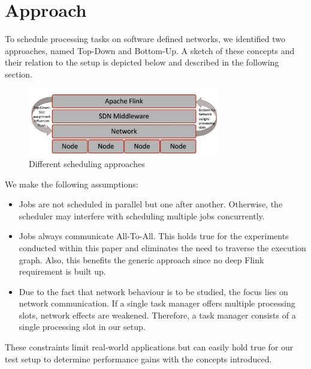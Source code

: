 \section{Approach}
To schedule processing tasks on software defined networks, we identified two approaches, named
Top-Down and Bottom-Up. A sketch of these concepts and their relation to the setup is depicted below
and described in the following section.\\

\begin{figure}[h]
    \centering
    \includegraphics[width=0.75\textwidth]{graphics/schedulingapproaches.png}
    \caption{Different scheduling approaches}
    \label{fig:schedulingapproaches}
\end{figure}

We make the following assumptions:
\begin{itemize}
\item Jobs are not scheduled in parallel but one after another. Otherwise, the scheduler may interfere
with scheduling multiple jobs concurrently.

\item Jobs always communicate All-To-All. This holds true for the experiments conducted within this paper
and eliminates the need to traverse the execution graph. Also, this benefits the generic approach
since no deep Flink requirement is built up.

\item Due to the fact that network behaviour is to be studied, the focus lies on network communication. If
a single task manager offers multiple processing slots, network effects are weakened. Therefore, a
task manager consists of a single processing slot in our setup.
\end{itemize}

These constraints limit real-world applications but can easily hold true for our test setup to
determine performance gains with the concepts introduced.

